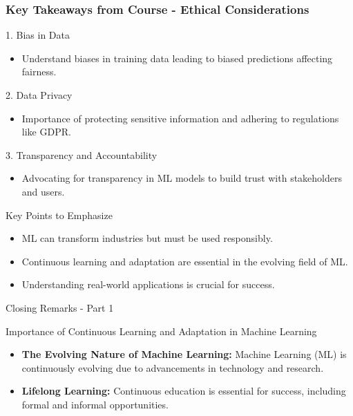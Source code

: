 \documentclass[aspectratio=169]{beamer}
\begin{document}
\begin{frame}[fragile]
    \frametitle{Key Takeaways from Course - Ethical Considerations}
    \begin{block}{1. Bias in Data}
        \begin{itemize}
            \item Understand biases in training data leading to biased predictions affecting fairness.
        \end{itemize}
    \end{block}
    
    \begin{block}{2. Data Privacy}
        \begin{itemize}
            \item Importance of protecting sensitive information and adhering to regulations like GDPR.
        \end{itemize}
    \end{block}

    \begin{block}{3. Transparency and Accountability}
        \begin{itemize}
            \item Advocating for transparency in ML models to build trust with stakeholders and users.
        \end{itemize}
    \end{block}

    \begin{block}{Key Points to Emphasize}
        \begin{itemize}
            \item ML can transform industries but must be used responsibly.
            \item Continuous learning and adaptation are essential in the evolving field of ML.
            \item Understanding real-world applications is crucial for success.
        \end{itemize}
    \end{block}
\end{frame}

\begin{frame}[fragile]{Closing Remarks - Part 1}
  \begin{block}{Importance of Continuous Learning and Adaptation in Machine Learning}
    \begin{itemize}
      \item \textbf{The Evolving Nature of Machine Learning:} 
        Machine Learning (ML) is continuously evolving due to advancements in technology and research.
      \item \textbf{Lifelong Learning:} 
        Continuous education is essential for success, including formal and informal opportunities.
    \end{itemize}
  \end{block}
\end{frame}
\end{document}

